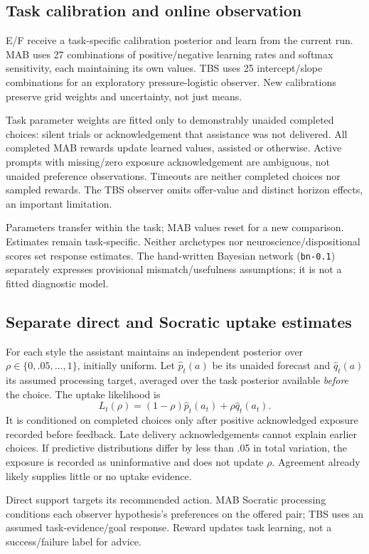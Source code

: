 \documentclass[11pt,a4paper]{article}
\begin{document}
\subsection{Task calibration and online observation}
E/F receive a task-specific calibration posterior and learn from the current run. MAB uses 27 combinations of positive/negative learning rates and softmax sensitivity, each maintaining its own values. TBS uses 25 intercept/slope combinations for an exploratory pressure-logistic observer. New calibrations preserve grid weights and uncertainty, not just means.

Task parameter weights are fitted only to demonstrably unaided completed choices: silent trials or acknowledgement that assistance was not delivered. All completed MAB rewards update learned values, assisted or otherwise. Active prompts with missing/zero exposure acknowledgement are ambiguous, not unaided preference observations. Timeouts are neither completed choices nor sampled rewards. The TBS observer omits offer-value and distinct horizon effects, an important limitation.

Parameters transfer within the task; MAB values reset for a new comparison. Estimates remain task-specific. Neither archetypes nor neuroscience/dispositional scores set response estimates. The hand-written Bayesian network (\texttt{bn-0.1}) separately expresses provisional mismatch/usefulness assumptions; it is not a fitted diagnostic model.

\subsection{Separate direct and Socratic uptake estimates}
For each style the assistant maintains an independent posterior over $\rho\in\{0,.05,\ldots,1\}$, initially uniform. Let $\widehat p_t(a)$ be its unaided forecast and $\widehat q_t(a)$ its assumed processing target, averaged over the task posterior available \emph{before} the choice. The uptake likelihood is
\[
 L_t(\rho)=(1-\rho)\widehat p_t(a_t)+\rho\widehat q_t(a_t).
\]
It is conditioned on completed choices only after positive acknowledged exposure recorded before feedback. Late delivery acknowledgements cannot explain earlier choices. If predictive distributions differ by less than .05 in total variation, the exposure is recorded as uninformative and does not update $\rho$. Agreement already likely supplies little or no uptake evidence.

Direct support targets its recommended action. MAB Socratic processing conditions each observer hypothesis's preferences on the offered pair; TBS uses an assumed task-evidence/goal response. Reward updates task learning, not a success/failure label for advice.
\end{document}
